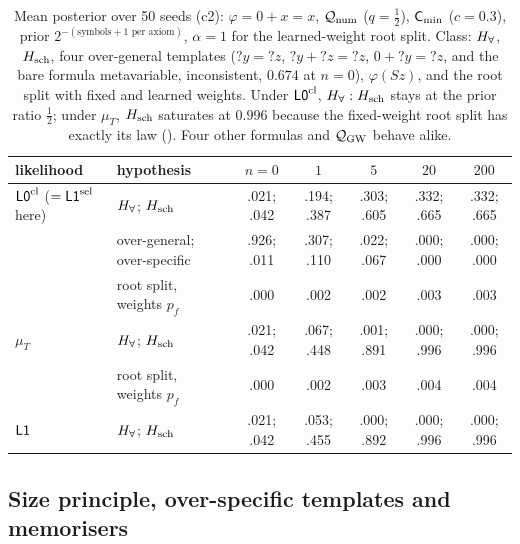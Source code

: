 \begin{table}[ht]
\centering\small
\setlength{\tabcolsep}{4pt}
\begin{tabular}{@{}llccccc@{}}
\toprule
likelihood & hypothesis & $n=0$ & $1$ & $5$ & $20$ & $200$\\
\midrule
$\mathord{\mathsf{L0}}^{\mathrm{cl}}$ ($=\mathord{\mathsf{L1}}^{\mathrm{sel}}$ here) & $H_{\forall}$; $H_{\mathrm{sch}}$ & .021; .042 & .194; .387 & .303; .605 & .332; .665 & .332; .665\\
 & over-general; over-specific & .926; .011 & .307; .110 & .022; .067 & .000; .000 & .000; .000\\
 & root split, weights $p_f$ & .000 & .002 & .002 & .003 & .003\\
$\mu_T$ & $H_{\forall}$; $H_{\mathrm{sch}}$ & .021; .042 & .067; .448 & .001; .891 & .000; .996 & .000; .996\\
 & root split, weights $p_f$ & .000 & .002 & .003 & .004 & .004\\
$\mathord{\mathsf{L1}}$ & $H_{\forall}$; $H_{\mathrm{sch}}$ & .021; .042 & .053; .455 & .000; .892 & .000; .996 & .000; .996\\
\bottomrule
\end{tabular}
\caption{Mean posterior over 50 seeds (c2): $\varphi=0+x=x$, $\mathcal{Q}_{\mathrm{num}}$ ($q=\tfrac12$), $\mathsf{C}_{\min}$ ($c=0.3$), prior $2^{-(\text{symbols}+1\text{ per axiom})}$, $\alpha=1$ for the learned-weight root split. Class: $H_{\forall}$, $H_{\mathrm{sch}}$, four over-general templates (${?y}={?z}$, ${?y}+{?z}={?z}$, $0+{?y}={?z}$, and the bare formula metavariable, inconsistent, $0.674$ at $n=0$), $\varphi(Sz)$, and the root split with fixed and learned weights. Under $\mathord{\mathsf{L0}}^{\mathrm{cl}}$, $H_{\forall}:H_{\mathrm{sch}}$ stays at the prior ratio $\tfrac12$; under $\mu_T$, $H_{\mathrm{sch}}$ saturates at $0.996$ because the fixed-weight root split has exactly its law (). Four other formulas and $\mathcal{Q}_{\mathrm{GW}}$ behave alike.}
\label{tab:univ:c2}
\end{table}

\subsection{Size principle, over-specific templates and memorisers}\label{app:univ:memo}

